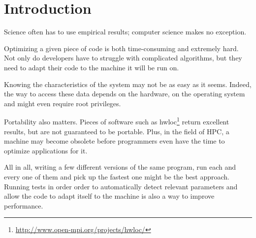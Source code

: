 \section{Introduction}
Science often has to use empirical results; computer science makes no
exception.

Optimizing a given piece of code is both time-consuming and extremely hard. Not
only do developers have to struggle with complicated algorithms, but they need
to adapt their code to the machine it will be run on.

Knowing the characteristics of the system may not be as easy as it seems.
Indeed, the way to access these data depends on the hardware, on the operating
system and might even require root privileges.

Portability also matters. Pieces of software such as
hwloc\footnote{\url{http://www.open-mpi.org/projects/hwloc/}} return excellent
results, but are not guaranteed to be portable. Plus, in the field of HPC, a
machine may become obsolete before programmers even have the time to optimize
applications for it.

All in all, writing a few different versions of the same program, run each and
every one of them and pick up the fastest one might be the best approach.
Running tests in order order to automatically detect relevant parameters and
allow the code to adapt itself to the machine is also a way to improve
performance.

